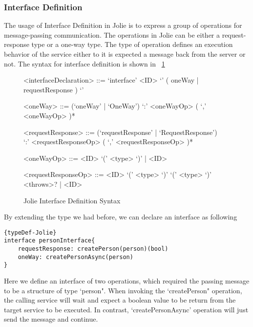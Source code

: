 \subsubsection{Interface Definition}
\label{sec:jolie-interface-def}

The usage of Interface Definition in Jolie is to express a group of operations for message-passing communication. The operations in Jolie can be either a request-response type or a one-way type. The type of operation defines an execution behavior of the service either to it is expected a message back from the server or not. The syntax for interface definition is shown in ~\ref{fig:InterfaceDefinitonSyntax}

\begin{figure}[h]
	\begin{framed}
		\begin{grammar}
			<interfaceDeclaration> ::= `interface' <ID> `{' ( oneWay | requestResponse ) `}'

			<oneWay> ::= (`oneWay' | `OneWay')  `:' <oneWayOp> ( `,' <oneWayOp> )*

			<requestResponse> ::= (`requestResponse' | `RequestResponse') \\ `:' <requestResponseOp> ( `,' <requestResponseOp> )*

			<oneWayOp> ::= <ID> `(' <type> `)' | <ID>

			<requestResponseOp> ::= <ID> `(' <type> `)' `(' <type> `)' <throws>? | <ID>

		\end{grammar}
	\end{framed}
	\caption{Jolie Interface Definition Syntax\protect\footnotemark}
	\label{fig:InterfaceDefinitonSyntax}
\end{figure}


By extending the type we had before, we can declare an interface as following
\begin{listing}[h]

\lstset{language=Jolie,
	style=codeStyle
}
\begin{lstlisting}[frame=tlrb, caption= {Jolie Interface declaration example} ]{typeDef-Jolie}
interface personInterface{
	requestResponse: createPerson(person)(bool)
	oneWay: createPersonAsync(person)
}
\end{lstlisting}
\end{listing}

Here we define an interface of two operations, which required the passing message to be a structure of type `person". When invoking the `createPerson" operation, the calling service will wait and expect a boolean value to be return from the target service to be executed. In contrast, `createPersonAsync' operation will just send the message and continue.

\FloatBarrier
